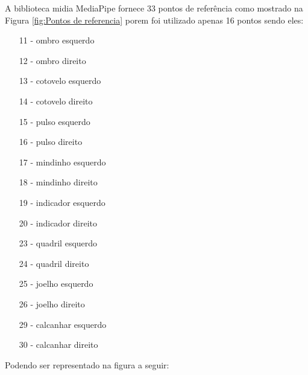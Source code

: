 A biblioteca midia MediaPipe fornece 33 pontos de referência como mostrado na Figura \ref{fig:Pontos de referencia} porem foi utilizado apenas 16 pontos sendo eles:

\begin{itemize}
    \item[11] - ombro esquerdo
    \item[12] - ombro direito
    \item[13] - cotovelo esquerdo
    \item[14] - cotovelo direito
    \item[15] - pulso esquerdo
    \item[16] - pulso direito
    \item[17] - mindinho esquerdo
    \item[18] - mindinho direito
    \item[19] - indicador esquerdo
    \item[20] - indicador direito
    \item[23] - quadril esquerdo
    \item[24] - quadril direito
    \item[25] - joelho esquerdo
    \item[26] - joelho direito
    \item[29] - calcanhar esquerdo
    \item[30] - calcanhar direito
\end{itemize}

\newpage
Podendo ser representado na figura a seguir:

